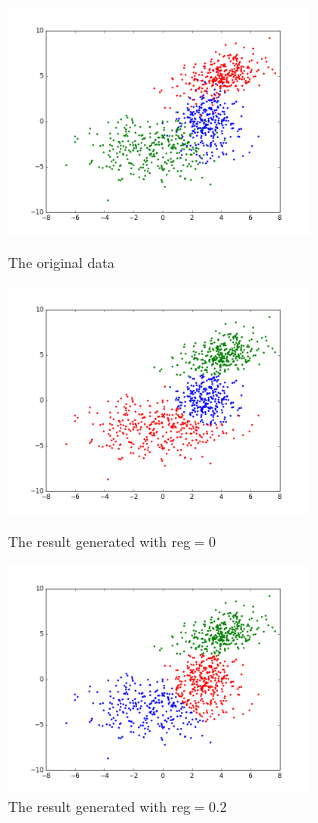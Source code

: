 \documentclass[12pt]{article}
\begin{document}
\begin{figure}[htbp]
  \centering
  \begin{minipage}[t]{0.48\linewidth}
      \centering
	  \includegraphics[width=8cm]{hw3_original.png}
	  \caption{The original data}  	
  \end{minipage}
  \hfill
  \begin{minipage}[t]{0.48\linewidth}
      \centering
      \includegraphics[width=8cm]{hw3_result_reg=0.png}
	  \caption{The result generated with reg$=0$}  	
  \end{minipage}
  \includegraphics[width=8cm]{hw3_result_reg=0.2.png}
  \caption{The result generated with reg$=0.2$}
\end{figure}
\end{document}
